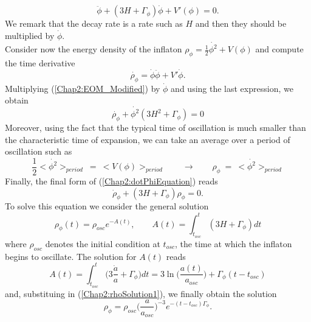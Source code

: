 \documentclass[11pt,a4paper,twoside]{book}
\begin{document}
\begin{equation}
	\label{Chap2:EOM_Modified}
	\ddot{\phi} + (3H + \Gamma_{\phi})\dot{\phi} + V'(\phi) = 0.
\end{equation}
We remark that the decay rate is a rate such as $H  $  and then they should be multiplied by $\dot{\phi}$.\\
Consider now the energy density of the inflaton $\rho_{\phi} = \frac{1}{2} \dot{\phi^{2}} + V(\phi)$ and compute the time derivative
\begin{equation}
	\label{Chap2:dotPhi}
	\dot{\rho_{\phi}}=\dot{\phi}\ddot{\phi} + V'\dot{\phi}.
\end{equation}
Multiplying (\ref{Chap2:EOM_Modified}) by $\dot{\phi}$ and using the last expression, we obtain
\begin{equation}
	\label{Chap2:dotPhiEquation}
	\dot{\rho_{\phi}} + \dot{\phi^{2}}(3H^{2} + \Gamma_{\phi}) = 0
\end{equation}
Moreover, using the fact that the typical time of oscillation is much smaller than the characteristic time of expansion, we can take an average over a period of oscillation such as
\begin{equation}
	\label{Chap2:oscillationAverage}
	\dfrac{1}{2} <\dot{\phi^{2}}>_{period}\ =\ <V(\phi)>_{period}\qquad \rightarrow\qquad \rho_{\phi}\ =\ <\dot{\phi^{2}}>_{period}
\end{equation}
Finally, the final form of (\ref{Chap2:dotPhiEquation}) reads
\begin{equation}
	\label{Chap2:FinalEqRho}
\dot{\rho}_{\phi} + (3H + \Gamma_{\phi})\rho_{\phi} = 0	.
\end{equation}
To solve this equation we consider the general solution
\begin{equation}
	\label{Chap2:rhoSolution1}
	\rho_{\phi}(t)=\rho_{osc}e^{-A(t)}, \qquad A(t)=\int_{t_{osc}}^{t}(3H+\Gamma_{\phi})dt
\end{equation}
where $ \rho_{osc} $ denotes the initial condition at $ t_{osc} $, the time at which the inflaton begins to oscillate. The solution for $ A(t) $ reads
\begin{equation}
	\label{Chap2:solutionAt)}
	A(t)= \int_{t_{osc}}^{t}\Big (3 \frac{\dot{a}}{a} + \Gamma_{\phi}\Big) dt = 3 \ln \Big(\frac{a(t)}{a_{osc}}\Big) + \Gamma_{\phi}(t-t_{osc})
\end{equation}
and, substituing in (\ref{Chap2:rhoSolution1}), we finally obtain the solution
\begin{equation}
\label{Chap2:rhoSolution}
\rho_{\phi} = \rho_{osc} \Big (\frac{a}{a_{osc}}\Big)^{-3}e^{-(t-t_{osc})\Gamma_{\phi}}.	
\end{equation}
\end{document}
